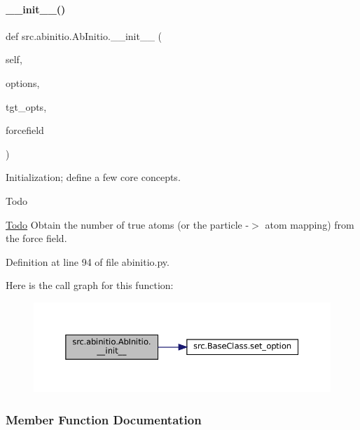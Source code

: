 \paragraph{\texorpdfstring{\+\_\+\+\_\+init\+\_\+\+\_\+()}{\_\_init\_\_()}}
{\footnotesize\ttfamily def src.\+abinitio.\+Ab\+Initio.\+\_\+\+\_\+init\+\_\+\+\_\+ (\begin{DoxyParamCaption}\item[{}]{self,  }\item[{}]{options,  }\item[{}]{tgt\+\_\+opts,  }\item[{}]{forcefield }\end{DoxyParamCaption})}



Initialization; define a few core concepts. 

\begin{DoxyRefDesc}{Todo}
\item[\hyperlink{todo__todo000001}{Todo}]Obtain the number of true atoms (or the particle -\/$>$ atom mapping) from the force field. \end{DoxyRefDesc}


Definition at line 94 of file abinitio.\+py.

Here is the call graph for this function\+:
\nopagebreak
\begin{figure}[H]
\begin{center}
\leavevmode
\includegraphics[width=350pt]{classsrc_1_1abinitio_1_1AbInitio_a05142b8321814feceac1a39ab338615e_cgraph}
\end{center}
\end{figure}


\subsubsection{Member Function Documentation}
\mbox{\label{classsrc_1_1abinitio_1_1AbInitio_a41dad975f9ae658f5ba75ee60f71c70b}} 
